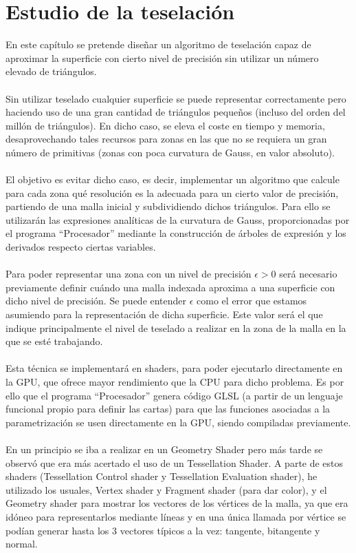 
\chapter{Estudio de la teselación}

En este capítulo se pretende diseñar un algoritmo de teselación capaz de aproximar la superficie con cierto nivel de precisión sin utilizar un número elevado de triángulos.\\
\\Sin utilizar teselado cualquier superficie se puede representar correctamente pero haciendo uso de una gran cantidad de triángulos pequeños (incluso del orden del millón de triángulos). En dicho caso, se eleva el coste en tiempo y memoria, desaprovechando tales recursos para zonas en las que no se requiera un gran número de primitivas (zonas con poca curvatura de Gauss, en valor absoluto).\\
\\El objetivo es evitar dicho caso, es decir, implementar un algoritmo que calcule para cada zona qué resolución es la adecuada para un cierto valor de precisión, partiendo de una malla inicial y subdividiendo dichos triángulos. Para ello se utilizarán las expresiones analíticas de la curvatura de Gauss, proporcionadas por el programa ``Procesador'' mediante la construcción de árboles de expresión y los derivados respecto ciertas variables.\\
\\Para poder representar una zona con un nivel de precisión $\epsilon > 0$ será necesario previamente definir cuándo una malla indexada aproxima a una superficie con dicho nivel de precisión. Se puede entender $\epsilon$ como el error que estamos asumiendo para la representación de dicha superficie. Este valor será el que indique principalmente el nivel de teselado a realizar en la zona de la malla en la que se esté trabajando.\\
\\Esta técnica se implementará en shaders, para poder ejecutarlo directamente en la GPU, que ofrece mayor rendimiento que la CPU para dicho problema. Es por ello que el programa ``Procesador'' genera código GLSL (a partir de un lenguaje funcional propio para definir las cartas) para que las funciones asociadas a la parametrización se usen directamente en la GPU, siendo compiladas previamente.\\
\\En un principio se iba a realizar en un Geometry Shader pero más tarde se observó que era más acertado el uso de un Tessellation Shader. A parte de estos shaders (Tessellation Control shader y Tessellation Evaluation shader), he utilizado los usuales, Vertex shader y Fragment shader (para dar color), y el Geometry shader para mostrar los vectores de los vértices de la malla, ya que era idóneo para representarlos mediante líneas y en una única llamada por vértice se podían generar hasta los $3$ vectores típicos a la vez: tangente, bitangente y normal.\\
